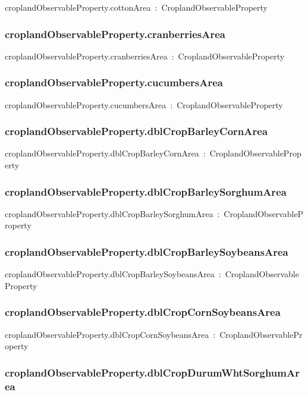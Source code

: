 \documentclass{article}
\begin{document}
croplandObservableProperty.cottonArea~:~CroplandObservableProperty

\subsubsection*{croplandObservableProperty.cranberriesArea}

croplandObservableProperty.cranberriesArea~:~CroplandObservableProperty

\subsubsection*{croplandObservableProperty.cucumbersArea}

croplandObservableProperty.cucumbersArea~:~CroplandObservableProperty

\subsubsection*{croplandObservableProperty.dblCropBarleyCornArea}

croplandObservableProperty.dblCropBarleyCornArea~:~CroplandObservableProperty

\subsubsection*{croplandObservableProperty.dblCropBarleySorghumArea}

croplandObservableProperty.dblCropBarleySorghumArea~:~CroplandObservableProperty

\subsubsection*{croplandObservableProperty.dblCropBarleySoybeansArea}

croplandObservableProperty.dblCropBarleySoybeansArea~:~CroplandObservableProperty

\subsubsection*{croplandObservableProperty.dblCropCornSoybeansArea}

croplandObservableProperty.dblCropCornSoybeansArea~:~CroplandObservableProperty

\subsubsection*{croplandObservableProperty.dblCropDurumWhtSorghumArea}
\end{document}
